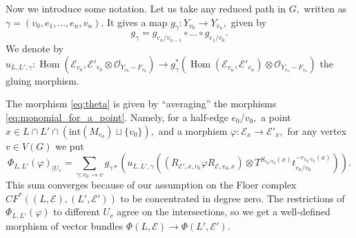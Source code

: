 \documentclass[11pt,leqno]{amsart}
\numberwithin{equation}{section}
\def\Hom{\operatorname{Hom}}
\newcommand{\cO}{{\mathcal O}}
\newcommand{\cE}{{\mathcal E}}
\begin{document}
Now we introduce some notation. Let us take any reduced path in $G,$ written as $\gamma=(v_0,e_1,\dots,e_n,v_n).$ It gives a map $g_{\gamma}:Y_{v_0}\to Y_{v_n},$ given by $$g_{\gamma}=g_{e_n/v_{n-1}}\circ\dots\circ g_{e_1/v_0}.$$ We denote by $u_{L,L',\gamma}:\Hom(\cE_{v_0},\cE'_{v_0}\otimes \cO_{Y_{v_0}-F_{v_0}})\to g_{\gamma}^*(\Hom(\cE_{v_n},\cE'_{v_n})\otimes \cO_{Y_{v_n}-F_{v_n}})$ the gluing morphism.

The morphism \eqref{eq:theta} is given by ``averaging'' the morphisms \eqref{eq:monomial_for_a_point}. Namely, for a half-edge $e_0/v_0,$ a point $x\in L\cap L'\cap (\mathrm{int}(M_{e_0})\sqcup\{v_0\}),$ and a morphism $\varphi:\cE_x\to\cE'_x,$ for any vertex $v\in V(G)$ we put
\begin{equation}\label{eq:averaging}\Phi_{L,L'}(\varphi)_{\mid U_v}=\sum\limits_{\gamma:v_0\to v}g_{\gamma*}(u_{L,L',\gamma}((R_{\cE',x,v_0}\varphi R_{\cE,v_0,x})\otimes T^{S_{e_0/v_0}(x)}t_{e_0/v_0}^{-r_{e_0/v_0}(x)})).\end{equation} This sum converges because of our assumption on the Floer complex $CF^{*}((L,\cE),(L',\cE'))$ to be concentrated in degree zero. The restrictions of $\Phi_{L,L'}(\varphi)$ to different $U_v$ agree on the intersections, so we get a well-defined morphism of vector bundles $\Phi(L,\cE)\to \Phi(L',\cE').$
\end{document}
